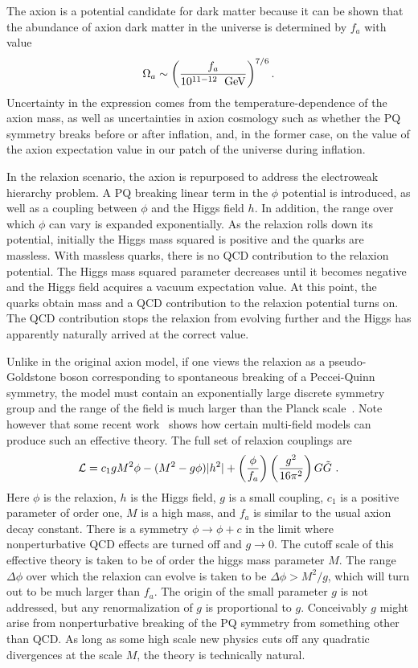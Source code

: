 \documentclass[12pt,aps,prd,showpacs,notitlepage,nofootinbib]{revtex4-1}
\newcommand{\gev}{\ {\rm GeV}}
\newcommand{\beq}{\begin{equation}}
\newcommand{\eeq}{\end{equation}}
\begin{document}
 The axion is a potential candidate for dark matter because it can be shown that the abundance of axion dark matter in the universe is determined by $f_a$ with value
\beq
\Omega_a\sim\left(f_a\over10^{11-12}\;\mbox{\gev}\right)^{7/6}.
\eeq
Uncertainty in the expression comes from the  temperature-dependence of the axion mass, as well as uncertainties in axion cosmology such as whether the PQ symmetry breaks before or after inflation, and, in the former case, on the value of the axion expectation value in our patch of the universe during inflation.

 In the relaxion scenario, the axion is repurposed to address the electroweak hierarchy problem. A PQ breaking linear term in the $\phi$ potential is introduced, as well as a coupling between $\phi$ and the Higgs field $h$. In addition, the range over which $\phi$ can vary is expanded exponentially. As the relaxion rolls down its potential, initially the Higgs mass squared is positive and the quarks are massless. With massless quarks, there is no QCD contribution to the relaxion potential. The Higgs mass squared parameter decreases until it becomes negative and the Higgs field acquires a vacuum expectation value. At this point, the quarks obtain mass and a QCD contribution to the relaxion potential turns on. The QCD contribution stops the relaxion from evolving further and the Higgs has apparently naturally arrived at the correct value. 
 
 Unlike in the original axion model, if one views the relaxion as a pseudo-Goldstone boson corresponding to spontaneous breaking of a Peccei-Quinn symmetry, the model must contain an exponentially large discrete symmetry group and the range of the field is much larger than the Planck scale~\cite{Gupta2016}. Note however that some recent work~\cite{Choi:2015fiu,Kaplan:2015fuy} shows how certain multi-field models can produce such an effective theory. The full set of relaxion couplings are
  \beq
 {\cal L}=c_1 g M^2 \phi - (M^2-g\phi) |h^2|+\left(\frac{\phi}{f_a}\right)\left(\frac{g^2}{16\pi^2}\right)G\tilde{G} \ .
 \eeq
Here $\phi$ is the relaxion, $h$ is the Higgs field, $g $ is a small coupling, $c_1$ is a positive parameter  of order one, $M$ is a high mass, and $f_a$ is similar to the usual axion  decay constant.  There is   a symmetry $\phi\rightarrow\phi+ c$ in the limit where nonperturbative QCD effects are turned off and $g\rightarrow0$.  The cutoff scale of this effective theory is taken to be of order the higgs mass parameter   $M$. The  range $\Delta\phi$ over which the relaxion can evolve is taken to be $\Delta \phi > M^2/g$, which will turn out to be much larger than $f_a$.  
The origin of the  small parameter $g$  is not addressed, but any renormalization of $g$ is proportional to $g$. Conceivably $g$ might arise from   nonperturbative breaking of the PQ symmetry from something other than QCD. As long as some high scale new physics cuts off any quadratic divergences at the scale $M$, the theory is technically natural. 
\end{document}
